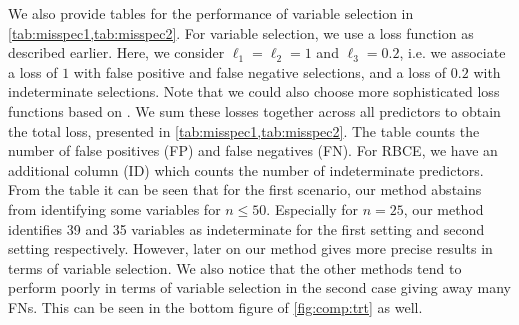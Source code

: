 \documentclass[preprint,12pt]{elsarticle}
\begin{document}
We also provide tables for the performance of variable selection in \cref{tab:misspec1,tab:misspec2}.
For variable selection, we use a loss function as described earlier.
Here, we consider
$\ell_1=\ell_2=1$ and $\ell_3= 0.2$,
i.e. we associate a loss of $1$ with false positive and false negative selections,
and a loss of $0.2$ with indeterminate selections.
Note that we could also choose more 
sophisticated loss functions based on \citep{ZAFFALON20121282}.
We sum these losses together across all predictors
to obtain the total loss, presented in \cref{tab:misspec1,tab:misspec2}.
The table counts the number of
false positives (FP) and false negatives (FN). For RBCE, we have an
additional column (ID)
which counts the number of indeterminate predictors.
From the table it can be seen that for the first scenario, our method
abstains from identifying some variables for 
$n \le 50$. Especially for $n=25$, our method identifies 39 and 35 variables as indeterminate
for the first setting and second setting respectively. However,
later on our method gives more precise results in terms of variable
selection. We also notice that the other methods tend to perform poorly
in terms of variable selection in the second case giving away many FNs. 
This can be seen in the bottom figure of \cref{fig:comp:trt}
as well.
\end{document}
